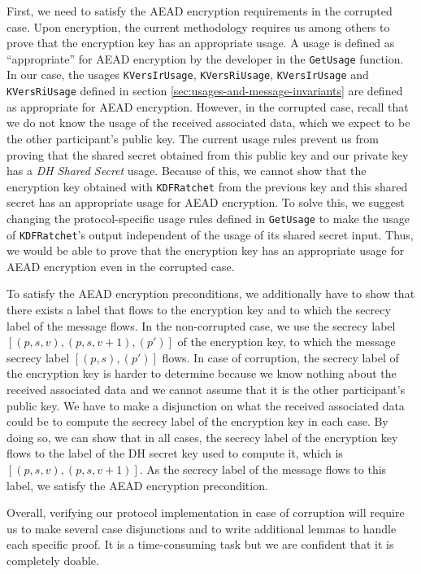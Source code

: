 First, we need to satisfy the AEAD encryption requirements in the corrupted case.
Upon encryption, the current methodology requires us among others to prove that the encryption key has an appropriate usage.
A usage is defined as “appropriate” for AEAD encryption by the developer in the \texttt{GetUsage} function.
In our case, the usages \texttt{KVersIrUsage}, \texttt{KVersRiUsage}, \texttt{KVersIrUsage} and \texttt{KVersRiUsage} defined in section \ref{sec:usages-and-message-invariants} are defined as appropriate for AEAD encryption.
However, in the corrupted case, recall that we do not know the usage of the received associated data, which we expect to be the other participant's public key.
The current usage rules prevent us from proving that the shared secret obtained from this public key and our private key has a \emph{DH Shared Secret} usage.
Because of this, we cannot show that the encryption key obtained with \texttt{KDFRatchet} from the previous key and this shared secret has an appropriate usage for AEAD encryption.
To solve this, we suggest changing the protocol-specific usage rules defined in \texttt{GetUsage} to make the usage of \texttt{KDFRatchet}'s output independent of the usage of its shared secret input.
Thus, we would be able to prove that the encryption key has an appropriate usage for AEAD encryption even in the corrupted case.

To satisfy the AEAD encryption preconditions, we additionally have to show that there exists a label that flows to the encryption key and to which the secrecy label of the message flows.
In the non-corrupted case, we use the secrecy label $[(p,s,v),(p,s,v+1),(p')]$ of the encryption key, to which the message secrecy label $[(p,s),(p')]$ flows.
In case of corruption, the secrecy label of the encryption key is harder to determine because we know nothing about the received associated data and we cannot assume that it is the other participant's public key.
We have to make a disjunction on what the received associated data could be to compute the secrecy label of the encryption key in each case.
By doing so, we can show that in all cases, the secrecy label of the encryption key flows to the label of the DH secret key used to compute it, which is $[(p,s,v),(p,s,v+1)]$. As the secrecy label of the message flows to this label, we satisfy the AEAD encryption precondition.

Overall, verifying our protocol implementation in case of corruption will require us to make several case disjunctions and to write additional lemmas to handle each specific proof.
It is a time-consuming task but we are confident that it is completely doable.

